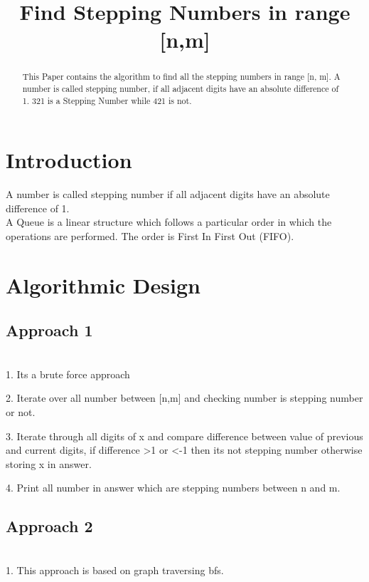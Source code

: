\documentclass[conference]{IEEEtran}
\begin{document}
\title{ Find Stepping Numbers in range [n,m]\\
}
\author{
\and
{}
\and
{}
}

\maketitle

\begin{abstract}
This Paper contains the algorithm to find all the stepping numbers in range [n, m]. A number is
called stepping number, if all adjacent digits have an absolute difference of 1. 321 is a
Stepping Number while 421 is not.
\end{abstract}


\section{Introduction}
A number is called stepping number if all adjacent digits have an absolute difference of 1.\\
A Queue is a linear structure which follows a particular order in which the operations are performed. The order is First In First Out (FIFO).\\
\section{Algorithmic Design}

\subsection{ \textbf{Approach 1}}
\\1. Its a brute force approach

2. Iterate over all number between [n,m] and checking number is stepping number or not.

3. Iterate through all digits of x and compare difference between value of previous and current digits, if difference \textgreater{}1 or \textless{}-1 then its not stepping number otherwise storing x in answer.

4. Print all number in answer which are stepping numbers between n and m.

\subsection{ \textbf{Approach 2}}
\\1. This approach is based on graph traversing bfs.
\end{document}
